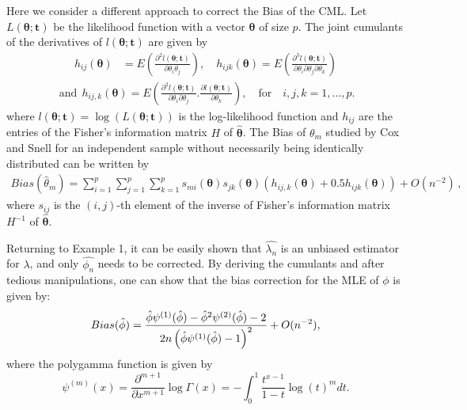 \documentclass[10pt,a4paper,onecolumn]{article} %
\begin{document}
Here we consider a different approach to correct the Bias of the CML. Let $L(\boldsymbol{\theta};\boldsymbol{t})$ be the likelihood function with a vector $\boldsymbol{\theta}$ of size $p$. The joint cumulants of the derivatives of $l(\boldsymbol{\theta};\boldsymbol{t})$ are given by
\begin{align*}
h_{ij}(\boldsymbol{\theta})&=E\left(\frac{\partial^2 l(\boldsymbol{\theta};\boldsymbol{t})}{\partial \theta_i\theta_j}\right), \quad
h_{ijk}(\boldsymbol{\theta})=E\left(\frac{\partial^3 l(\boldsymbol{\theta};\boldsymbol{t})}{\partial\theta_i\partial\theta_j\partial\theta_k} \right) 
\end{align*}
\begin{align*}
\ \mbox{and} \ \  h_{ij,k}(\boldsymbol{\theta})=E\left(\frac{\partial^2 l(\boldsymbol{\theta};\boldsymbol{t})}{\partial\theta_i\partial\theta_j}.\frac{\partial l(\boldsymbol{\theta};\boldsymbol{t})}{\partial\theta_k} \right), \quad \mbox{for} \quad i,j,k=1,\ldots,p.
\end{align*}
where $l(\boldsymbol{\theta};\boldsymbol{t})=\log(L(\boldsymbol{\theta};\boldsymbol{t}))$ is the log-likelihood function and $h_{ij}$ are the entries of the Fisher's information matrix $H$ of $\boldsymbol{\hat\theta}$.
%
The Bias of $\theta_m$ studied by Cox and Snell \cite{cox1968general} for an independent sample without necessarily being identically distributed can be written by
\begin{equation}\label{coxsnell}
\begin{aligned}
Bias(\hat{\theta}_m)=\sum_{i=1}^{p}\sum_{j=1}^{p}\sum_{k=1}^{p}s_{mi}(\boldsymbol{\theta})s_{jk}(\boldsymbol{\theta})\left(h_{ij,k}(\boldsymbol{\theta})+0.5h_{ijk}(\boldsymbol{\theta}) \right)+O(n^{-2}) \, ,
\end{aligned}
\end{equation}
where $s_{ij}$ is the $(i,j)$-th element of the inverse of Fisher's information matrix $H^{-1}$ of $\boldsymbol{\hat\theta}$.


Returning to Example 1, it can be easily shown that $\hat{\lambda_n}$ is an unbiased estimator for $\lambda$, and only $\hat{\phi_n}$ needs to be corrected. By deriving the cumulants and after tedious manipulations, one can show that the bias correction for the MLE of $\phi$ is given by:
\vspace{-0.1cm}
\begin{equation}\label{eqbiasmu}
Bias(\hat{\phi})=\frac{\hat{\phi}\psi^{(1)}(\hat{\phi})-\hat{\phi}^2\psi^{(2)}(\hat{\phi})-2}{2n\left(\hat{\phi}\psi^{(1)}(\hat{\phi})-1\right)^2}+O(n^{-2}),
\vspace{-0.1cm}
\end{equation}
where the polygamma function is given by
$$
\psi^{(m)}(x)=\frac{\partial^{m+1}}{\partial x^{m+1}}\log\Gamma(x)=-\int_{0}^{1}\frac{t^{x-1}}{1-t}\log(t)^m dt.
$$ 
\end{document}
